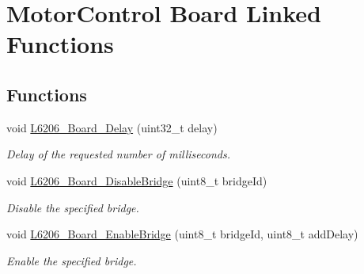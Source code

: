 \hypertarget{group___motor_control___board___linked___functions}{}\section{Motor\+Control Board Linked Functions}
\label{group___motor_control___board___linked___functions}
\subsection*{Functions}
\begin{DoxyCompactItemize}
\item 
\mbox{\label{group___motor_control___board___linked___functions_ga0f818ed1083c923e2700e6db31c033f7}} 
void \mbox{\hyperlink{group___motor_control___board___linked___functions_ga0f818ed1083c923e2700e6db31c033f7}{L6206\+\_\+\+Board\+\_\+\+Delay}} (uint32\+\_\+t delay)
\begin{DoxyCompactList}\small\item\em Delay of the requested number of milliseconds. \end{DoxyCompactList}\item 
\mbox{\label{group___motor_control___board___linked___functions_ga7ba535a402c6d40c9922f1c2609e6b7d}} 
void \mbox{\hyperlink{group___motor_control___board___linked___functions_ga7ba535a402c6d40c9922f1c2609e6b7d}{L6206\+\_\+\+Board\+\_\+\+Disable\+Bridge}} (uint8\+\_\+t bridge\+Id)
\begin{DoxyCompactList}\small\item\em Disable the specified bridge. \end{DoxyCompactList}\item 
\mbox{\label{group___motor_control___board___linked___functions_ga6e7dd07e15445c787bcd960c32b9e700}} 
void \mbox{\hyperlink{group___motor_control___board___linked___functions_ga6e7dd07e15445c787bcd960c32b9e700}{L6206\+\_\+\+Board\+\_\+\+Enable\+Bridge}} (uint8\+\_\+t bridge\+Id, uint8\+\_\+t add\+Delay)
\begin{DoxyCompactList}\small\item\em Enable the specified bridge. \end{DoxyCompactList}\item 

\end{DoxyCompactItemize}
